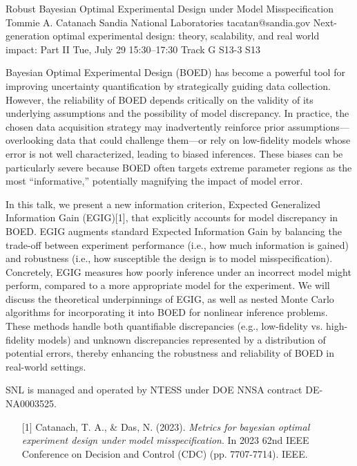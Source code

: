 \begin{talk}
  {Robust Bayesian Optimal Experimental Design under Model Misspecification}%
  {Tommie A. Catanach}%
  {Sandia National Laboratories}%
  {tacatan@sandia.gov}%
  {Next-generation optimal experimental design: theory, scalability, and real world impact: Part II}%
  {}%
  {Tue, July 29 15:30–17:30 Track G}%
  {S13-3}%
  {S13}%
				
			
Bayesian Optimal Experimental Design (BOED) has become a powerful tool for improving uncertainty quantification by strategically guiding data collection. However, the reliability of BOED depends critically on the validity of its underlying assumptions and the possibility of model discrepancy. In practice, the chosen data acquisition strategy may inadvertently reinforce prior assumptions—overlooking data that could challenge them—or rely on low-fidelity models whose error is not well characterized, leading to biased inferences. These biases can be particularly severe because BOED often targets extreme parameter regions as the most “informative,” potentially magnifying the impact of model error.

In this talk, we present a new information criterion, Expected Generalized Information Gain (EGIG)[1], that explicitly accounts for model discrepancy in BOED. EGIG augments standard Expected Information Gain by balancing the trade-off between experiment performance (i.e., how much information is gained) and robustness (i.e., how susceptible the design is to model misspecification). Concretely, EGIG measures how poorly inference under an incorrect model might perform, compared to a more appropriate model for the experiment. We will discuss the theoretical underpinnings of EGIG, as well as nested Monte Carlo algorithms for incorporating it into BOED for nonlinear inference problems. These methods handle both quantifiable discrepancies (e.g., low-fidelity vs. high-fidelity models) and unknown discrepancies represented by a distribution of potential errors, thereby enhancing the robustness and reliability of BOED in real-world settings.

SNL is managed and operated by NTESS under DOE NNSA contract DE-NA0003525. 
\medskip

\begin{enumerate}
	\item[{[1]}] Catanach, T. A., \& Das, N. (2023). {\it Metrics for bayesian optimal experiment design under model misspecification}. In 2023 62nd IEEE Conference on Decision and Control (CDC) (pp. 7707-7714). IEEE.
\end{enumerate}
\end{talk}

